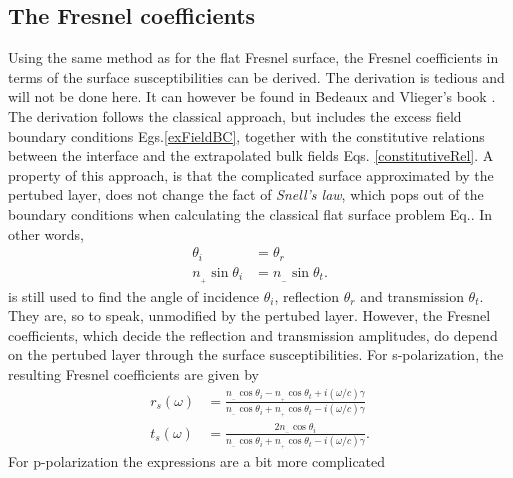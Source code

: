 \subsection{The Fresnel coefficients}
Using the same method as for the flat Fresnel surface, the Fresnel coefficients in terms of the surface
susceptibilities can be derived. The derivation is tedious and will not be done here. It can however
be found in Bedeaux and Vlieger's book \cite[p.~45]{BedeauxVliegerBook}.
The derivation follows the classical approach, but includes the excess field boundary conditions 
Egs.\eqref{exFieldBC}, together with the constitutive relations between the interface 
and the extrapolated bulk fields Eqs. \eqref{constitutiveRel}.
A property of this approach, is that the complicated surface approximated by the pertubed layer,
does not change the fact of \textit{Snell's law}, which pops out of the boundary conditions
when calculating the classical flat surface problem Eq.\cite[p.~388]{Griffiths}. In other words, 
\begin{subequations}
\label{snellsLaw}
\begin{align}
   \theta_i &= \theta_r \label{snellsLaw1}\\
   n_{_+} \sin \theta_i &= n_{_-} \sin \theta_t. \label{snellsLaw2}
\end{align}
\end{subequations}
is still used to find the angle of incidence $\theta_i$, reflection $\theta_r$ and transmission $\theta_t$.
They are, so to speak, unmodified by the pertubed layer. However, the Fresnel coefficients, which
decide the reflection and transmission amplitudes, do depend on the pertubed layer through 
the surface susceptibilities. 
For s-polarization, the resulting Fresnel coefficients are given by \cite{Lazzari2002}
\begin{subequations}
   \label{fresCoeffS}
\begin{align}
   r_s(\omega) &= \frac{n\!_{_-} \cos \theta_i - n\!_{_+} \cos \theta_t + i(\omega/c) \gamma}{n\!_{_-} \cos \theta_i + n\!_{_+} \cos \theta_t - i(\omega/c) \gamma} \label{fresCoeffS1} \\
   t_s(\omega) &= \frac{2 n\!_{_-} \cos \theta_i}{n\!_{_-} \cos \theta_i + n\!_{_+} \cos \theta_t - i(\omega/c) \gamma}. \label{fresCoeffS2}
\end{align}
\end{subequations}
%
For p-polarization the expressions are a bit more complicated
%
